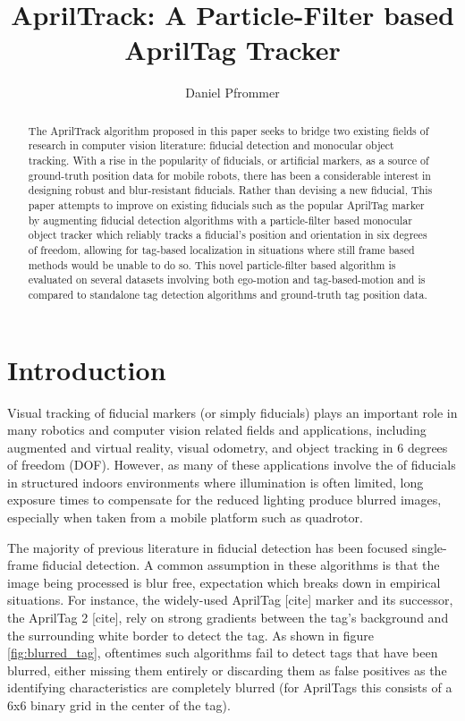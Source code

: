 \documentclass[letterpaper, 10 pt, conference]{ieeeconf}
\title{\textbf{AprilTrack: A Particle-Filter based AprilTag Tracker}}
\author{Daniel Pfrommer}
\date{}
\begin{document}
\maketitle

\begin{abstract}

	The AprilTrack algorithm proposed in this paper seeks to bridge two existing fields of research in computer vision literature: fiducial detection and monocular object tracking. With a rise in the popularity of fiducials, or artificial markers, as a source of ground-truth position data for mobile robots, there has been a considerable interest in designing robust and blur-resistant fiducials. Rather than devising a new fiducial, This paper attempts to improve on existing fiducials such as the popular AprilTag marker by augmenting fiducial detection algorithms with a particle-filter based monocular object tracker which reliably tracks a fiducial's position and orientation in six degrees of freedom, allowing for tag-based localization in situations where still frame based methods would be unable to do so. This novel particle-filter based algorithm is evaluated on several datasets involving both ego-motion and tag-based-motion and is compared to standalone tag detection algorithms and ground-truth tag position data.
	
\end{abstract}

\section{Introduction}


Visual tracking of fiducial markers (or simply fiducials) plays an important role in many robotics and computer vision related fields and applications, including augmented and virtual reality, visual odometry, and object tracking in 6 degrees of freedom (DOF). However, as many of these applications involve the of fiducials in structured indoors environments where illumination is often limited, long exposure times to compensate for the reduced lighting produce blurred images, especially when taken from a mobile platform such as quadrotor.


 The majority of previous literature in fiducial detection has been focused single-frame fiducial detection. A common assumption in these algorithms is that the image being processed is blur free, expectation which breaks down in empirical situations. For instance, the widely-used AprilTag [cite] marker and its successor, the AprilTag 2 [cite], rely on strong gradients between the tag's background and the surrounding white border to detect the tag. As shown in figure \ref{fig:blurred_tag}, oftentimes such algorithms fail to detect tags that have been blurred, either missing them entirely or discarding them as false positives as the identifying characteristics are completely blurred (for AprilTags this consists of a 6x6 binary grid in the center of the tag).
 
\end{document}
